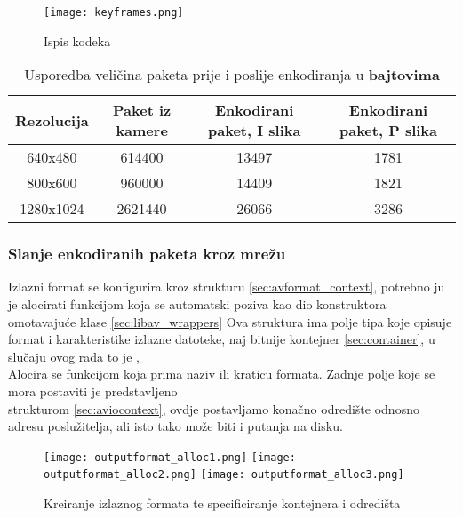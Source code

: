 \begin{figure}[H]
  \texttt{[image: keyframes.png]}
  \caption{Ispis kodeka}
\end{figure}

\begin{center}
  \begin{table}[h]
    \begin{tabular}{|c|c|c|c|}
      \hline
      Rezolucija & Paket iz kamere & Enkodirani paket, I slika & Enkodirani paket, P slika \\
      \hline
      640x480 & 614400 & 13497 & 1781 \\[0.5cm]
      800x600 & 960000 & 14409 & 1821 \\[0.5cm]
      1280x1024 & 2621440 & 26066 & 3286 \\[0.5cm]
      \hline
    \end{tabular}
    \caption[Usporedba veličina paketa prije i poslije enkodiranja]{Usporedba veličina paketa prije i poslije enkodiranja u \textbf{bajtovima}}
\end{table}
\end{center}

\subsubsection{Slanje enkodiranih paketa kroz mrežu}
Izlazni format se konfigurira kroz strukturu  \ref{sec:avformat_context}, potrebno ju je
alocirati funkcijom  koja se automatski poziva kao dio konstruktora omotavajuće
klase \ref{sec:libav_wrappers}
\paraBreak
Ova struktura ima polje tipa  koje opisuje format i karakteristike izlazne datoteke,
naj bitnije kontejner \ref{sec:container},
u slučaju ovog rada to je ,
\\
Alocira se funkcijom  koja prima naziv ili kraticu formata.
\paraBreak
Zadnje polje koje se mora postaviti je  predstavljeno \\
strukturom  \ref{sec:aviocontext}, ovdje postavljamo konačno odredište odnosno adresu poslužitelja, ali
isto tako može biti i putanja na disku.
\begin{figure}[h]
  \texttt{[image: outputformat\_alloc1.png]}
  \texttt{[image: outputformat\_alloc2.png]}
  \texttt{[image: outputformat\_alloc3.png]}
  \caption[Kreiranje izlaznog formata]{Kreiranje izlaznog formata te specificiranje kontejnera i odredišta}
\end{figure}

